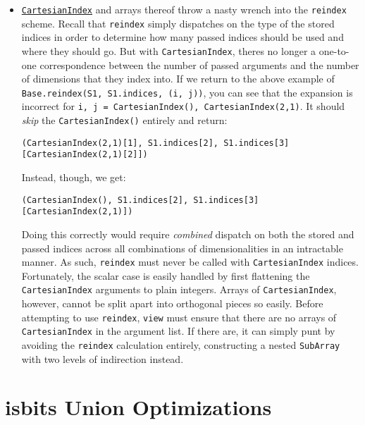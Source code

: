 \begin{itemize}
\item \hyperlink{4571802376991525093}{\texttt{CartesianIndex}} and arrays thereof throw a nasty wrench into the \texttt{reindex} scheme. Recall that \texttt{reindex} simply dispatches on the type of the stored indices in order to determine how many passed indices should be used and where they should go. But with \texttt{CartesianIndex}, there{\textquotesingle}s no longer a one-to-one correspondence between the number of passed arguments and the number of dimensions that they index into. If we return to the above example of \texttt{Base.reindex(S1, S1.indices, (i, j))}, you can see that the expansion is incorrect for \texttt{i, j = CartesianIndex(), CartesianIndex(2,1)}. It should \emph{skip} the \texttt{CartesianIndex()} entirely and return:


\begin{verbatim}
(CartesianIndex(2,1)[1], S1.indices[2], S1.indices[3][CartesianIndex(2,1)[2]])
\end{verbatim}

Instead, though, we get:


\begin{verbatim}
(CartesianIndex(), S1.indices[2], S1.indices[3][CartesianIndex(2,1)])
\end{verbatim}

Doing this correctly would require \emph{combined} dispatch on both the stored and passed indices across all combinations of dimensionalities in an intractable manner. As such, \texttt{reindex} must never be called with \texttt{CartesianIndex} indices. Fortunately, the scalar case is easily handled by first flattening the \texttt{CartesianIndex} arguments to plain integers. Arrays of \texttt{CartesianIndex}, however, cannot be split apart into orthogonal pieces so easily. Before attempting to use \texttt{reindex}, \texttt{view} must ensure that there are no arrays of \texttt{CartesianIndex} in the argument list. If there are, it can simply {\textquotedbl}punt{\textquotedbl} by avoiding the \texttt{reindex} calculation entirely, constructing a nested \texttt{SubArray} with two levels of indirection instead.

\end{itemize}


\hypertarget{9194487374122863540}{}


\section{isbits Union Optimizations}



